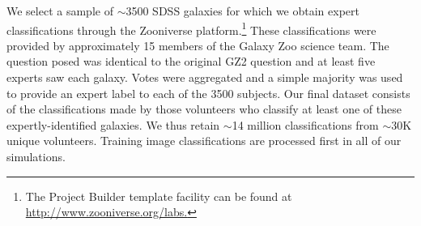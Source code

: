 \documentclass[twocolumn]{aastex6}
\begin{document}
We select a sample of $\sim$3500 SDSS galaxies for which we obtain expert classifications through the Zooniverse platform.\footnote{The Project Builder template facility can be found at \url{http://www.zooniverse.org/labs.}}
These classifications were provided by approximately 15 members of the
Galaxy Zoo science team. %
 The question posed was identical to the original GZ2
question and at least five experts saw each galaxy. %
Votes were aggregated and a simple majority was used to provide an expert label to
each of the 3500 subjects. 
Our final dataset consists of the classifications made 
by those volunteers who classify at least one of these expertly-identified galaxies. 
We thus retain $\sim$14 million classifications from $\sim$30K unique volunteers. 
Training image classifications are processed first in all of our simulations. 


\end{document}

